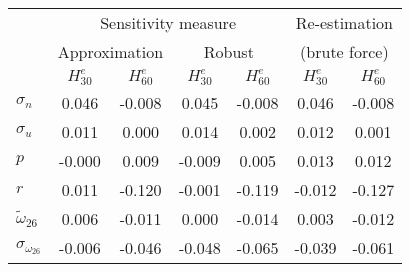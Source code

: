 \begin{tabular}{l*{6}{c}} \toprule 
& \multicolumn{4}{c}{Sensitivity measure} & \multicolumn{2}{c}{Re-estimation} \\ \cmidrule(lr){2-5}   
& \multicolumn{2}{c}{Approximation} & \multicolumn{2}{c}{Robust} & \multicolumn{2}{c}{(brute force)} \\ \cmidrule(lr){2-3} \cmidrule(lr){4-5} \cmidrule(lr){6-7}  
& $H^e_{30}$ & $H^e_{60}$ & $H^e_{30}$ & $H^e_{60}$ & $H^e_{30}$ & $H^e_{60}$ \\ \cmidrule(lr){2-7} 
  $\sigma_{n}$ & 0.046 & -0.008 & 0.045 & -0.008 & 0.046 & -0.008 \\ 
  $\sigma_{u}$ & 0.011 & 0.000 & 0.014 & 0.002 & 0.012 & 0.001 \\ 
  $p$ & -0.000 & 0.009 & -0.009 & 0.005 & 0.013 & 0.012 \\ 
  $r$ & 0.011 & -0.120 & -0.001 & -0.119 & -0.012 & -0.127 \\ 
  $\tilde{\omega}_{26}$ & 0.006 & -0.011 & 0.000 & -0.014 & 0.003 & -0.012 \\ 
  $\sigma_{\omega_{26}}$ & -0.006 & -0.046 & -0.048 & -0.065 & -0.039 & -0.061 \\ 
 \bottomrule 
 \end{tabular}